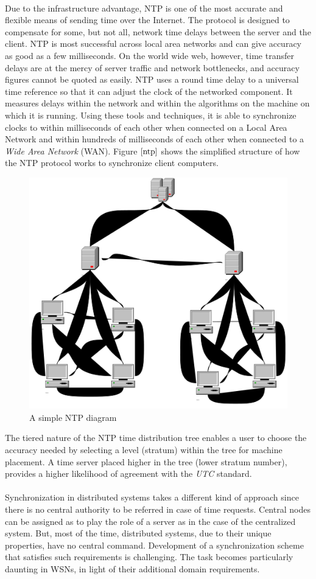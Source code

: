 \documentclass[a4paper,10pt]{report}
\begin{document}
\paragraph*{}
Due to the infrastructure advantage, NTP is one of the most accurate and flexible means of sending time over the Internet. The protocol is designed to compensate for some, but not all, network time delays between the server and the client. NTP is most successful across local area networks and can give accuracy as good as a few milliseconds. On the world wide web, however, time transfer delays are at the mercy of server traffic and network bottlenecks, and accuracy figures cannot be quoted as easily. NTP uses a round time delay to a universal time reference so that it can adjust the clock of the networked component. It measures delays within the network and within the algorithms on the machine on which it is running. Using  these tools and techniques, it is able to synchronize clocks to within milliseconds of each other when connected on a Local Area Network and within hundreds of milliseconds of each other when connected to a \textit{Wide Area Network} (WAN). Figure $\ref{ntp}$ shows the simplified structure of how the NTP protocol works to synchronize client computers.
\begin{figure}
\centering
\includegraphics[width= 0.5 \textwidth]{ntp}
\caption{A simple NTP diagram} \label{ntp}
\end{figure}
The tiered nature of the NTP time distribution tree enables a user to choose the accuracy needed by selecting a level (stratum) within
the tree for machine placement. A time server placed higher in the tree (lower stratum number), provides a higher likelihood of
agreement with the \textit{UTC} standard.
\paragraph*{}
Synchronization in distributed systems takes a different kind of approach since there is no central authority to be referred
in case of time requests. Central nodes can be assigned as to play the role of a server as in the case of the centralized system.
But, most of the time, distributed systems, due to their unique properties, have no central command. Development of a synchronization
scheme that satisfies such requirements is challenging. The task becomes particularly daunting in WSNs, in light of their additional
domain requirements.
\end{document}
